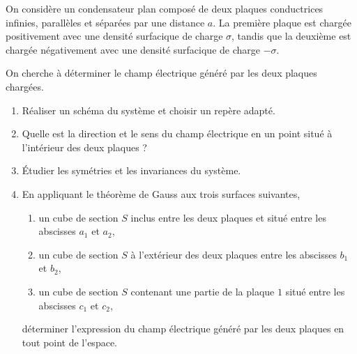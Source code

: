 \begin{exocor}
On considère un condensateur plan composé de deux plaques conductrices infinies,
parallèles et séparées par une distance $a$. La
première plaque est chargée positivement avec une densité surfacique de charge
$\sigma$, tandis que la deuxième est chargée négativement avec une densité 
surfacique de charge $-\sigma$.

On cherche à déterminer le champ électrique généré par les deux plaques chargées.

\begin{enumerate}
	\item Réaliser un schéma du système et choisir un repère adapté.
	\item Quelle est la direction et le sens du champ électrique en un point
	  situé à l'intérieur des deux plaques ?
	\item Étudier les symétries et les invariances du système. 
	\item En appliquant le théorème de Gauss aux trois surfaces suivantes,
	  	  	\begin{enumerate}
			\item un cube de section $S$ inclus entre les deux plaques 
			  et situé entre les abscisses $a_1$ et $a_2$,
			\item un cube de section $S$ à l'extérieur des deux plaques
			  entre les abscisses $b_1$ et $b_2$,
			\item un cube de section $S$ contenant une partie 
			  de la plaque $1$ situé entre les abscisses $c_1$ et
			  $c_2$,

		\end{enumerate}
	déterminer l'expression du champ électrique généré par les deux plaques
	en tout point de l'espace.
\end{enumerate}
\end{exocor}
\newpage


